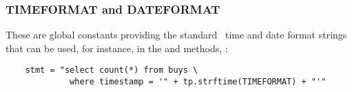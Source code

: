 \subsubsection{TIMEFORMAT and DATEFORMAT}
These are global constants providing the
standard \nowdb\ time and date format
strings that can be used, for instance,
in the 
 and  methods, \eg:

\begin{python}
\begin{lstlisting}
    stmt = "select count(*) from buys \
             where timestamp = '" + tp.strftime(TIMEFORMAT) + "'"
\end{lstlisting}
\end{python}
